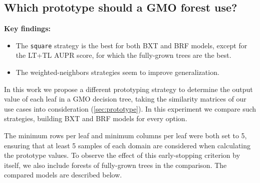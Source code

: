% 
% 


\subsection{Which prototype should a GMO forest use?}

\label{sec:prototype_comparison}

\begin{mdframed}
    \textbf{Key findings:}
    \begin{itemize}
        \item The \texttt{square} strategy is the best for both BXT and BRF models, except for the LT+TL AUPR score, for which the fully-grown trees are the best.
        \item The weighted-neighbors strategies seem to improve generalization.
    \end{itemize}
\end{mdframed}

In this work we propose a different prototyping strategy to determine the output value of each leaf in a GMO decision tree, taking the similarity matrices of our use cases into consideration (\autoref{sec:prototype}).
%
In this experiment we compare such strategies, building BXT and BRF models for every option.

The minimum rows per leaf and minimum columns per leaf were both set to 5, ensuring that at least 5 samples of each domain are considered when calculating the prototype values.
%
To observe the effect of this early-stopping criterion by itself, we also include forests of fully-grown trees in the comparison. The compared models are described below.

